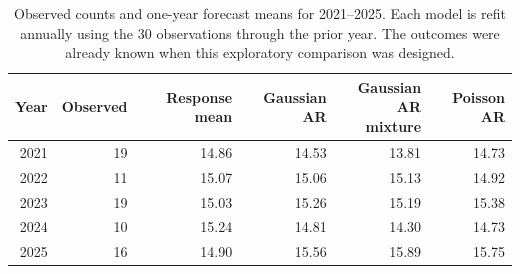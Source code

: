 \begin{table}[htbp]
\centering\small
\caption{Observed counts and one-year forecast means for 2021--2025. Each model is refit annually using the 30 observations through the prior year. The outcomes were already known when this exploratory comparison was designed.}
\label{tab:ar-reassessment-recent}
\begin{tabular}{@{}rrrrrr@{}}
\toprule
Year & Observed & Response mean & Gaussian AR & \shortstack{Gaussian AR\\mixture} & Poisson AR \\
\midrule
2021 & 19 & 14.86 & 14.53 & 13.81 & 14.73 \\
2022 & 11 & 15.07 & 15.06 & 15.13 & 14.92 \\
2023 & 19 & 15.03 & 15.26 & 15.19 & 15.38 \\
2024 & 10 & 15.24 & 14.81 & 14.30 & 14.73 \\
2025 & 16 & 14.90 & 15.56 & 15.89 & 15.75 \\
\bottomrule
\end{tabular}
\end{table}
